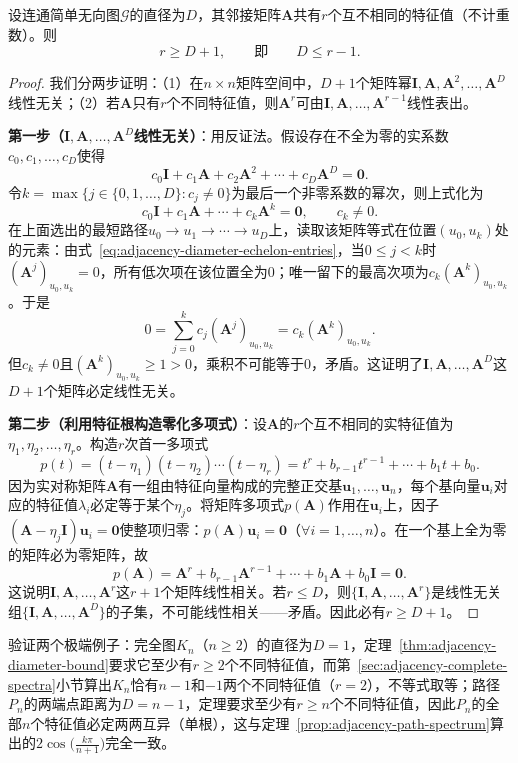 \begin{theorem}[直径的谱界]
\label{thm:adjacency-diameter-bound}
设连通简单无向图$\mathcal G$的直径为$D$，其邻接矩阵$\bm A$共有$r$个互不相同的特征值（不计重数）。则
\begin{equation}
r\geq D+1,\qquad\text{即}\qquad D\leq r-1.
\label{eq:adjacency-diameter-bound}
\end{equation}
\end{theorem}

\begin{proof}
我们分两步证明：（1）在$n\times n$矩阵空间中，$D+1$个矩阵幂$\bm I,\bm A,\bm A^2,\ldots,\bm A^D$线性无关；（2）若$\bm A$只有$r$个不同特征值，则$\bm A^r$可由$\bm I,\bm A,\ldots,\bm A^{r-1}$线性表出。

\textbf{第一步（$\bm I,\bm A,\ldots,\bm A^D$线性无关）}：用反证法。假设存在不全为零的实系数$c_0,c_1,\ldots,c_D$使得
\[
c_0\bm I+c_1\bm A+c_2\bm A^2+\cdots+c_D\bm A^D=\bm 0.
\]
令$k=\max\{j\in\{0,1,\ldots,D\}:c_j\neq 0\}$为最后一个非零系数的幂次，则上式化为
\[
c_0\bm I+c_1\bm A+\cdots+c_k\bm A^k=\bm 0,\qquad c_k\neq 0.
\]
在上面选出的最短路径$u_0\to u_1\to\cdots\to u_D$上，读取该矩阵等式在位置$(u_0,u_k)$处的元素：由式~\eqref{eq:adjacency-diameter-echelon-entries}，当$0\leq j<k$时$(\bm A^j)_{u_0,u_k}=0$，所有低次项在该位置全为$0$；唯一留下的最高次项为$c_k(\bm A^k)_{u_0,u_k}$。于是
\[
0=\sum_{j=0}^k c_j(\bm A^j)_{u_0,u_k}=c_k(\bm A^k)_{u_0,u_k}.
\]
但$c_k\neq 0$且$(\bm A^k)_{u_0,u_k}\geq 1>0$，乘积不可能等于$0$，矛盾。这证明了$\bm I,\bm A,\ldots,\bm A^D$这$D+1$个矩阵必定线性无关。

\textbf{第二步（利用特征根构造零化多项式）}：设$\bm A$的$r$个互不相同的实特征值为$\eta_1,\eta_2,\ldots,\eta_r$。构造$r$次首一多项式
\[
p(t)=(t-\eta_1)(t-\eta_2)\cdots(t-\eta_r)=t^r+b_{r-1}t^{r-1}+\cdots+b_1 t+b_0.
\]
因为实对称矩阵$\bm A$有一组由特征向量构成的完整正交基$\bm u_1,\ldots,\bm u_n$，每个基向量$\bm u_i$对应的特征值$\lambda_i$必定等于某个$\eta_j$。将矩阵多项式$p(\bm A)$作用在$\bm u_i$上，因子$(\bm A-\eta_j\bm I)\bm u_i=\bm 0$使整项归零：$p(\bm A)\bm u_i=\bm 0$（$\forall i=1,\ldots,n$）。在一个基上全为零的矩阵必为零矩阵，故
\[
p(\bm A)=\bm A^r+b_{r-1}\bm A^{r-1}+\cdots+b_1\bm A+b_0\bm I=\bm 0.
\]
这说明$\bm I,\bm A,\ldots,\bm A^r$这$r+1$个矩阵线性相关。若$r\leq D$，则$\{\bm I,\bm A,\ldots,\bm A^r\}$是线性无关组$\{\bm I,\bm A,\ldots,\bm A^D\}$的子集，不可能线性相关——矛盾。因此必有$r\geq D+1$。
\end{proof}

验证两个极端例子：完全图$K_n$（$n\geq 2$）的直径为$D=1$，定理~\ref{thm:adjacency-diameter-bound}要求它至少有$r\geq 2$个不同特征值，而第~\ref{sec:adjacency-complete-spectra}小节算出$K_n$恰有$n-1$和$-1$两个不同特征值（$r=2$），不等式取等；路径$P_n$的两端点距离为$D=n-1$，定理要求至少有$r\geq n$个不同特征值，因此$P_n$的全部$n$个特征值必定两两互异（单根），这与定理~\ref{prop:adjacency-path-spectrum}算出的$2\cos\bigl(\frac{k\pi}{n+1}\bigr)$完全一致。

